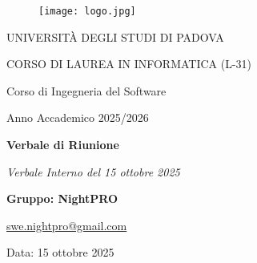 \documentclass[a4paper, 11pt, oneside]{scrartcl} %
\begin{document}
\thispagestyle{empty}
\begin{titlepage}
    \centering
    
\begin{figure}
    \centering
    \texttt{[image: logo.jpg]}
\end{figure}

    \vfill
    
    {\small UNIVERSITÀ DEGLI STUDI DI PADOVA \par}
    {\small CORSO DI LAUREA IN INFORMATICA (L-31) \par}
    \vspace{0.5cm}
    {\large Corso di Ingegneria del Software \par}
    {\small Anno Accademico 2025/2026 \par}


    
    \vfill
    
    {\Huge \bfseries Verbale di Riunione \par}
    
    \vspace{1cm}
    
    {\Large \itshape Verbale Interno del 15 ottobre 2025 \par} 
    
    \vfill
    
    {\Large \bfseries Gruppo: NightPRO \par}
    \vspace{0.5cm}
    {\large \href{mailto:swe.nightpro@gmail.com}{swe.nightpro@gmail.com} \par}
    
    \vfill
    
    {\large Data: 15 ottobre 2025 \par}

\end{titlepage}

\newpage
\tableofcontents %
\pagestyle{fancy} %

\newpage
\end{document}
